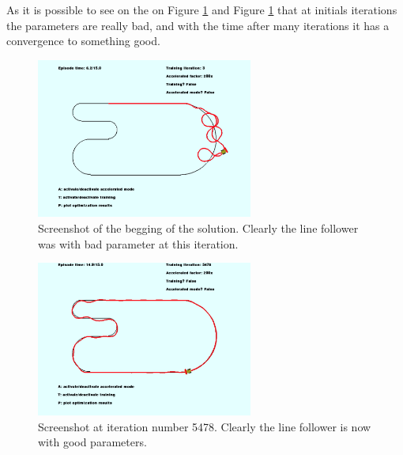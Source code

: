 As it is possible to see on the on Figure \ref{img:initial_line_follower_solution} and Figure \ref{img:initial_line_follower_solution} that at initials iterations the parameters are really bad, and with the time after many iterations it has a convergence to something good.

\begin{figure}
  \begin{center}
  \includegraphics[width=2.8in]{./../code/results/initial_line_follower_solution.png}
  \caption{Screenshot of the begging of the solution. Clearly the line follower was with bad parameter at this iteration.}
  \label{img:initial_line_follower_solution}
  \end{center}
\end{figure}

\begin{figure}
  \begin{center}
  \includegraphics[width=2.8in]{./../code/results/line_follower_solution.png}
  \caption{Screenshot at iteration number 5478. Clearly the line follower is now with good parameters.}
  \label{img:line_follower_solution}
  \end{center}
\end{figure}


\vfill


